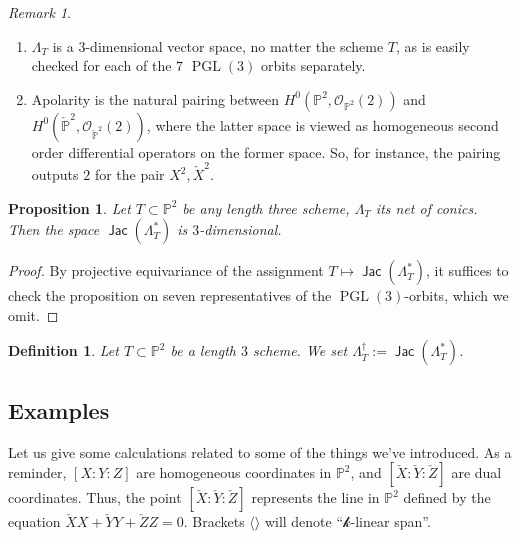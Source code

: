 \documentclass[reqno, 11pt]{amsart}
\theoremstyle{plain}
\newtheorem{proposition}[theorem]{Proposition}
\newtheorem{definition}[theorem]{Definition}
\theoremstyle{remark}
\newtheorem{remark}[theorem]{Remark}
\renewcommand{\P}{\mathbb{P}}
\renewcommand{\k}{\mathscr{k}}
\DeclareMathOperator{\PGL}{PGL}
\renewcommand{\O}{\mathcal{O}}
\DeclareMathOperator{\jac}{\mathsf{Jac}}
\begin{document}
\begin{remark}
\label{remark:alwaysthreedimensional}
\begin{enumerate}
  \item $\Lambda_{T}$ is a $3$-dimensional vector space, no matter the
  scheme $T$, as is easily checked for each of the $7$ $\PGL(3)$
  orbits separately.
  \item Apolarity is the natural pairing between $H^{0}(\P^{2}, \O_{\P^{2}}(2))$ and $H^{0}(\check{\P}^{2}, \O_{\check{\P}^{2}}(2))$, where the latter space is viewed as homogeneous second order differential operators on the former space. So, for instance, the pairing outputs $2$ for the pair $X^{2}, \check{X}^{2}$.
\end{enumerate}
\end{remark}







\begin{proposition}
  \label{proposition:JacobianNet}
  Let $T \subset \P^{2}$ be any length three scheme, $\Lambda_{T}$ its
  net of conics. Then the space $\jac(\Lambda_{T}^{*})$ is 
  $3$-dimensional.

\end{proposition}

\begin{proof}
  By projective equivariance of the assignment
  $T \mapsto \jac(\Lambda_{T}^{*})$, it suffices to check the
  proposition on seven representatives of the $\PGL(3)$-orbits, which
  we omit.
\end{proof}

\begin{definition}
  \label{definition:dagger}
  Let $T \subset \P^{2}$ be a length $3$ scheme. We set
  $\Lambda_{T}^{\dagger} := \jac(\Lambda_{T}^{*})$.
\end{definition}


\subsection{Examples}
Let us give some calculations related to some of the things we've introduced. As a reminder, $[X:Y:Z]$ are homogeneous
coordinates in $\P^{2}$, and $[\check{X}:\check{Y}:\check{Z}]$ are dual
coordinates. Thus, the point $[\check{X}:\check{Y}:\check{Z}]$ represents the line in $\P^{2}$
defined by the equation $\check{X}X+\check{Y}Y+\check{Z}Z = 0$. Brackets $\langle \rangle $
will denote ``$\k$-linear span''.
\end{document}
